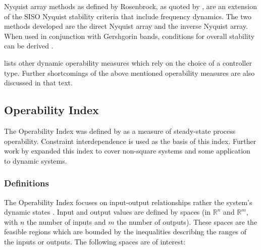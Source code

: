 Nyquist array methods as defined by Rosenbrock, as quoted by \citet[92]{skogestad}, are an extension of the SISO Nyquist stability criteria that include frequency dynamics. 
The two methods developed are the direct Nyquist array and the inverse Nyquist array. 
When used in conjunction with Gershgorin bands, conditions for overall stability can be derived \citep[440]{skogestad}.

\citet{vinsonphd} lists other dynamic operability measures which rely on the choice of a controller type. Further shortcomings of the above mentioned operability measures are also discussed in that text. 

\subsection{Operability Index}\label{sec:oi}
The Operability Index was defined by \citet{vinsonphd} as a measure of steady-state process operability. 
Constraint interdependence is used as the basis of this index. 
Further work by \citet{limaphd} expanded this index to cover non-square systems and some application to dynamic systems.%
%

\subsubsection{Definitions}
The Operability Index focuses on input-output relationships rather the system's dynamic states \citep{vinsonphd}. 
Input and output values are defined by spaces (in $\mathbb{R}^n$ and $\mathbb{R}^m$, with $n$ the number of inputs and $m$ the number of outputs). 
These spaces are the feasible regions which are bounded by the inequalities describing the ranges of the inputs or outputs. 
The following spaces are of interest:%
%
%
%

